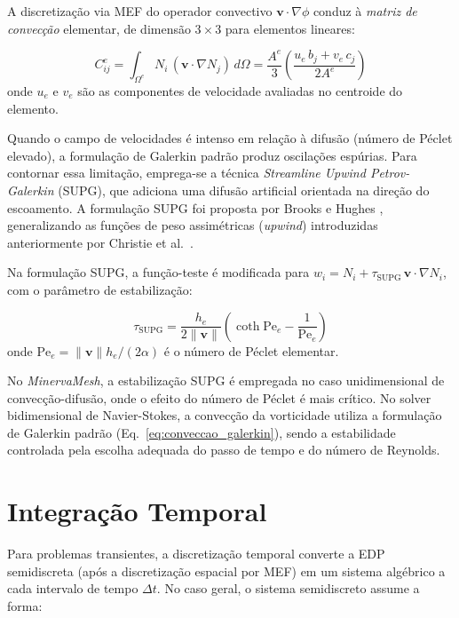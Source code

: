 A discretização via MEF do operador convectivo $\mathbf{v} \cdot \nabla \phi$ conduz à \textit{matriz de convecção} elementar, de dimensão $3 \times 3$ para elementos lineares:

\begin{equation}
C_{ij}^e = \int_{\Omega^e} N_i \, (\mathbf{v} \cdot \nabla N_j) \, d\Omega = \frac{A^e}{3} \left( \frac{u_e \, b_j + v_e \, c_j}{2 A^e} \right)
\label{eq:conveccao_galerkin}
\end{equation}
onde $u_e$ e $v_e$ são as componentes de velocidade avaliadas no centroide do elemento.

Quando o campo de velocidades é intenso em relação à difusão (número de Péclet elevado), a formulação de Galerkin padrão produz oscilações espúrias. Para contornar essa limitação, emprega-se a técnica \textit{Streamline Upwind Petrov-Galerkin} (SUPG), que adiciona uma difusão artificial orientada na direção do escoamento. A formulação SUPG foi proposta por Brooks e Hughes \cite{Brooks1982}, generalizando as funções de peso assimétricas (\textit{upwind}) introduzidas anteriormente por Christie et al.\ \cite{Christie1976}.

Na formulação SUPG, a função-teste é modificada para $w_i = N_i + \tau_{\text{SUPG}} \, \mathbf{v} \cdot \nabla N_i$, com o parâmetro de estabilização:

\begin{equation}
\tau_{\text{SUPG}} = \frac{h_e}{2 \|\mathbf{v}\|} \left( \coth \text{Pe}_e - \frac{1}{\text{Pe}_e} \right)
\label{eq:tau_supg}
\end{equation}
onde $\text{Pe}_e = \|\mathbf{v}\| h_e / (2\alpha)$ é o número de Péclet elementar.

No \textit{MinervaMesh}, a estabilização SUPG é empregada no caso unidimensional de convecção-difusão, onde o efeito do número de Péclet é mais crítico. No solver bidimensional de Navier-Stokes, a convecção da vorticidade utiliza a formulação de Galerkin padrão (Eq.~\ref{eq:conveccao_galerkin}), sendo a estabilidade controlada pela escolha adequada do passo de tempo e do número de Reynolds.

\section{Integração Temporal}
\label{sec:integracao_temporal}

Para problemas transientes, a discretização temporal converte a EDP semidiscreta (após a discretização espacial por MEF) em um sistema algébrico a cada intervalo de tempo $\Delta t$. No caso geral, o sistema semidiscreto assume a forma:

